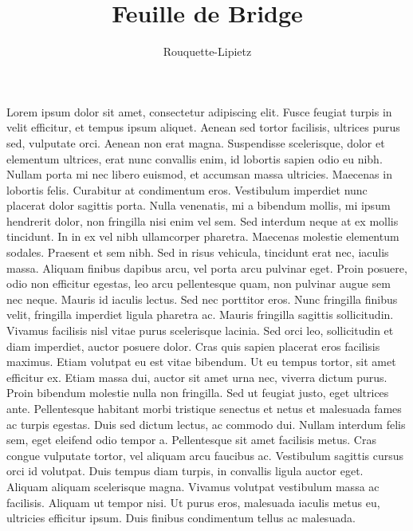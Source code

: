 \documentclass[twoside,a4paper]{article}
\begin{document}
\fancyfoot[CE]{\thepage}
\fancyfoot[CO]{\thepage}
\fancyhead{}

\title{Feuille de Bridge}
\author{Rouquette-Lipietz}



\begin{triple}
Lorem ipsum dolor sit amet, consectetur adipiscing elit. Fusce feugiat turpis in velit efficitur, et tempus ipsum aliquet. Aenean sed tortor facilisis, ultrices purus sed, vulputate orci. Aenean non erat magna. Suspendisse scelerisque, dolor et elementum ultrices, erat nunc convallis enim, id lobortis sapien odio eu nibh. Nullam porta mi nec libero euismod, et accumsan massa ultricies. Maecenas in lobortis felis. Curabitur at condimentum eros. Vestibulum imperdiet nunc placerat dolor sagittis porta. Nulla venenatis, mi a bibendum mollis, mi ipsum hendrerit dolor, non fringilla nisi enim vel sem. Sed interdum neque at ex mollis tincidunt. In in ex vel nibh ullamcorper pharetra. Maecenas molestie elementum sodales. Praesent et sem nibh. Sed in risus vehicula, tincidunt erat nec, iaculis massa. Aliquam finibus dapibus arcu, vel porta arcu pulvinar eget. Proin posuere, odio non efficitur egestas, leo arcu pellentesque quam, non pulvinar augue sem nec neque.
Mauris id iaculis lectus. Sed nec porttitor eros. Nunc fringilla finibus velit, fringilla imperdiet ligula pharetra ac. Mauris fringilla sagittis sollicitudin. Vivamus facilisis nisl vitae purus scelerisque lacinia. Sed orci leo, sollicitudin et diam imperdiet, auctor posuere dolor. Cras quis sapien placerat eros facilisis maximus. Etiam volutpat eu est vitae bibendum. Ut eu tempus tortor, sit amet efficitur ex. Etiam massa dui, auctor sit amet urna nec, viverra dictum purus. Proin bibendum molestie nulla non fringilla. Sed ut feugiat justo, eget ultrices ante. Pellentesque habitant morbi tristique senectus et netus et malesuada fames ac turpis egestas.
Duis sed dictum lectus, ac commodo dui. Nullam interdum felis sem, eget eleifend odio tempor a. Pellentesque sit amet facilisis metus. Cras congue vulputate tortor, vel aliquam arcu faucibus ac. Vestibulum sagittis cursus orci id volutpat. Duis tempus diam turpis, in convallis ligula auctor eget. Aliquam aliquam scelerisque magna. Vivamus volutpat vestibulum massa ac facilisis. Aliquam ut tempor nisi. Ut purus eros, malesuada iaculis metus eu, ultricies efficitur ipsum. Duis finibus condimentum tellus ac malesuada.

\end{triple}
\end{document}
